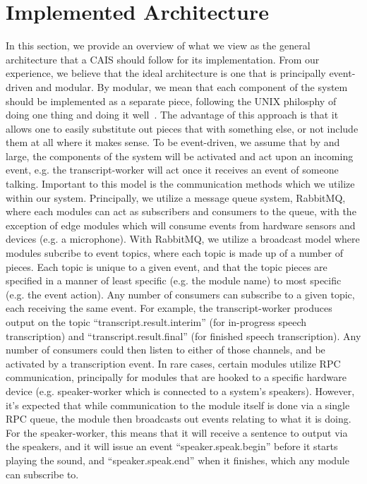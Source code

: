 \section{Implemented Architecture}

In this section, we provide an overview of what we view as the general
architecture that a CAIS should follow for its implementation. From our
experience, we believe that the ideal architecture is one that is principally
event-driven and modular. By modular, we mean that each component of the system
should be implemented as a separate piece, following the UNIX philosphy of
doing one thing and doing it well~\cite{mcilroy_unix_1978}. The advantage of
this approach is that it allows one to easily substitute out pieces that with
something else, or not include them at all where it makes sense. To be
event-driven, we assume that by and large, the components of the system will
be activated and act upon an incoming event, e.g. the transcript-worker will
act once it receives an event of someone talking. Important to this model is
the communication methods which we utilize within our system. Principally, we
utilize a message queue system, RabbitMQ, where each modules can act as
subscribers and consumers to the queue, with the exception of edge modules
which will consume events from hardware sensors and devices (e.g. a microphone).
With RabbitMQ, we utilize a broadcast model where modules subcribe to event
topics, where each topic is made up of a number of pieces. Each topic is
unique to a given event, and that the topic pieces are specified in a manner of
least specific (e.g. the module name) to most specific (e.g. the event action).
Any number of consumers can subscribe to a given topic, each receiving the same
event. For example, the transcript-worker produces output on the topic
``transcript.result.interim'' (for in-progress speech transcription) and
``transcript.result.final'' (for finished speech transcription). Any number of
consumers could then listen to either of those channels, and be activated by
a transcription event. In rare cases, certain modules utilize RPC communication,
principally for modules that are hooked to a specific hardware device (e.g.
speaker-worker which is connected to a system's speakers). However, it's
expected that while communication to the module itself is done via a single RPC
queue, the module then broadcasts out events relating to what it is doing. For
the speaker-worker, this means that it will receive a sentence to output
via the speakers, and it will issue an event ``speaker.speak.begin'' before
it starts playing the sound, and ``speaker.speak.end'' when it finishes, which
any module can subscribe to.


